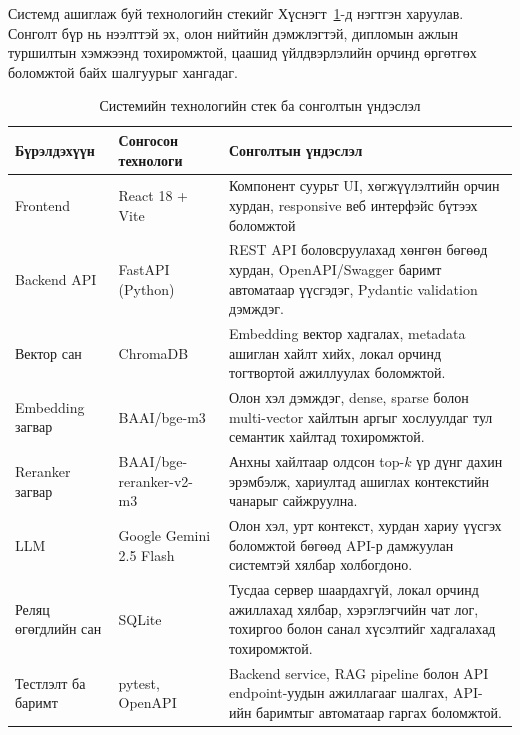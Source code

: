 Системд ашиглаж буй технологийн стекийг Хүснэгт~\ref{tab:tech-stack}-д нэгтгэн харуулав. Сонголт бүр нь нээлттэй эх, олон нийтийн дэмжлэгтэй, дипломын ажлын туршилтын хэмжээнд тохиромжтой, цаашид үйлдвэрлэлийн орчинд өргөтгөх боломжтой байх шалгуурыг хангадаг.

\begin{table}[H]
\centering
\footnotesize
\renewcommand{\arraystretch}{1.2}
\setlength{\tabcolsep}{4pt}
\begin{tabular}{|p{2.8cm}|p{3.5cm}|p{7.0cm}|}
\hline
\textbf{Бүрэлдэхүүн} & \textbf{Сонгосон технологи} & \textbf{Сонголтын үндэслэл} \\ \hline
Frontend & React 18 + Vite~\cite{react_docs,vite_docs} & Компонент суурьт UI, хөгжүүлэлтийн орчин хурдан, responsive веб интерфэйс бүтээх боломжтой \\ \hline
Backend API & FastAPI (Python)~\cite{fastapi} & REST API боловсруулахад хөнгөн бөгөөд хурдан, OpenAPI/Swagger баримт автоматаар үүсгэдэг, Pydantic validation дэмждэг. \\ \hline
Вектор сан & ChromaDB~\cite{chromadb} & Embedding вектор хадгалах, metadata ашиглан хайлт хийх, локал орчинд тогтвортой ажиллуулах боломжтой. \\ \hline
Embedding загвар & BAAI/bge-m3~\cite{bge_m3} & Олон хэл дэмждэг, dense, sparse болон multi-vector хайлтын аргыг хослуулдаг тул семантик хайлтад тохиромжтой. \\ \hline
Reranker загвар & BAAI/bge-reranker-v2-m3~\cite{bge_reranker} & Анхны хайлтаар олдсон top-$k$ үр дүнг дахин эрэмбэлж, хариултад ашиглах контекстийн чанарыг сайжруулна. \\ \hline
LLM & Google Gemini 2.5 Flash~\cite{gemini_report,gemini_api} & Олон хэл, урт контекст, хурдан хариу үүсгэх боломжтой бөгөөд API-р дамжуулан системтэй хялбар холбогдоно. \\ \hline
Реляц өгөгдлийн сан & SQLite~\cite{sqlite} & Тусдаа сервер шаардахгүй, локал орчинд ажиллахад хялбар, хэрэглэгчийн чат лог, тохиргоо болон санал хүсэлтийг хадгалахад тохиромжтой. \\ \hline
Тестлэлт ба баримт & pytest, OpenAPI & Backend service, RAG pipeline болон API endpoint-уудын ажиллагааг шалгах, API-ийн баримтыг автоматаар гаргах боломжтой. \\ \hline
\end{tabular}
\caption[Системийн технологийн стек]{Системийн технологийн стек ба сонголтын үндэслэл}
\label{tab:tech-stack}
\end{table}


